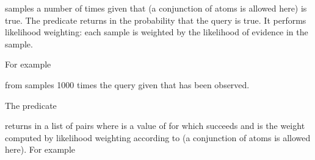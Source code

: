 \documentclass[letterpaper,10pt,english]{sphinxmanual}
\begin{document}
\sphinxAtStartPar
samples  a number of  times given that  (a conjunction of atoms is allowed here) is true.
The predicate returns in  the probability that the query is true.
It performs likelihood weighting: each sample is weighted by the likelihood of evidence in the sample.

\sphinxAtStartPar
For example

\begin{sphinxVerbatim}[commandchars=\\\{\}]
 
\end{sphinxVerbatim}

\sphinxAtStartPar
from  samples 1000 times the query  given that  has been observed.

\sphinxAtStartPar
The predicate

\begin{sphinxVerbatim}[commandchars=\\\{\}]
  
\end{sphinxVerbatim}

\sphinxAtStartPar
returns in  a list of pairs  where  is a value of  for which  succeeds and  is the weight computed by likelihood weighting according to  (a conjunction of atoms is allowed here).
For example

\begin{sphinxVerbatim}[commandchars=\\\{\}]
 
\end{sphinxVerbatim}
\end{document}
